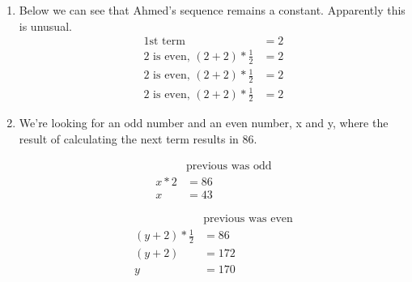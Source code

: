\documentclass[11pt]{article}
\begin{document}
\begin{enumerate}
\begin{enumerate}
            \item Below we can see that Ahmed's sequence remains a constant. Apparently this is unusual.
                \begin{equation*}
                    \begin{split}
                        \text{1st term}&=2\\
                        \text{2 is even, }(2+2)*\frac{1}{2}&=2\\
                        \text{2 is even, }(2+2)*\frac{1}{2}&=2\\
                        \text{2 is even, }(2+2)*\frac{1}{2}&=2
                    \end{split}
                \end{equation*}

            \item
                We're looking for an odd number and an even number, x and y,
                where the result of calculating the next term results in 86.
                \begin{minipage}{0.5\textwidth}
                    \begin{equation*}
                        \begin{split}
                            &\text{previous was odd}\\
                            x*2&=86\\
                            x&=43
                        \end{split}
                    \end{equation*}
                \end{minipage}%
                \begin{minipage}{0.5\textwidth}
                    \begin{equation*}
                        \begin{split}
                            &\text{previous was even}\\
                            (y+2)*\frac{1}{2}&=86\\
                            (y+2)&=172\\
                            y&=170
                        \end{split}
                    \end{equation*}
                \end{minipage}


\end{enumerate}
\end{enumerate}
\end{document}
